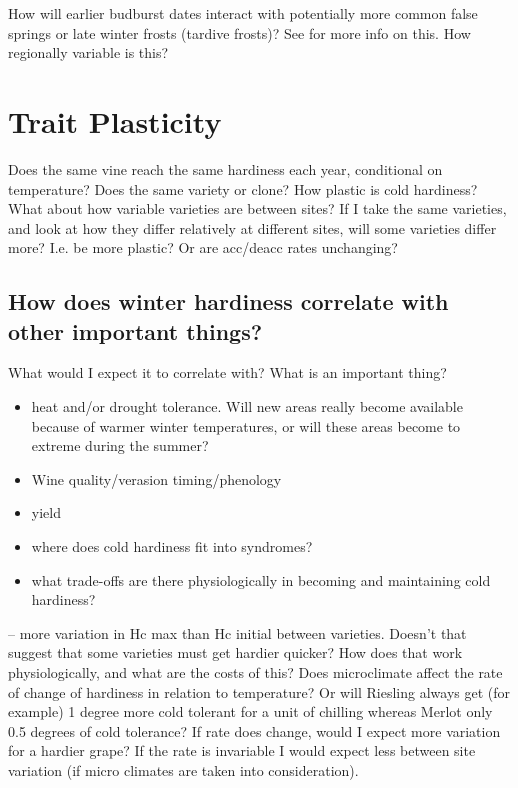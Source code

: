 \documentclass[11pt,letter]{article}
\begin{document}
How will earlier budburst dates interact with potentially more common false springs or late winter frosts (tardive frosts)? See \cite{Sgubin2018} for more info on this. How regionally variable is this?\\

\section{Trait Plasticity} 
Does the same vine reach the same hardiness each year, conditional on temperature? Does the same variety or clone? How plastic is cold hardiness? \\

What about how variable varieties are between sites? If I take the same varieties, and look at how they differ relatively at different sites, will some varieties differ more? I.e. be more plastic? Or are acc/deacc rates unchanging?\\


\subsection{How does winter hardiness correlate with other important things?}
What would I expect it to correlate with? What is an important thing?
\begin{itemize}
\item heat and/or drought tolerance. Will new areas really become available because of warmer winter temperatures, or will these areas become to extreme during the summer?
\item Wine quality/verasion timing/phenology{}
\item yield
\item where does cold hardiness fit into syndromes?
\item what trade-offs are there physiologically in becoming and maintaining cold hardiness?  
\end{itemize}

\cite{Ferguson2014} – more variation in Hc max than Hc initial between varieties. Doesn't that suggest that some varieties must get hardier quicker? How does that work physiologically, and what are the costs of this? Does microclimate affect the rate of change of hardiness in relation to temperature? Or will Riesling always get (for example) 1 degree more cold tolerant for a unit of chilling whereas Merlot only 0.5 degrees of cold tolerance? If rate does change, would I expect more variation for a hardier grape? If the rate is invariable I would expect less between site variation (if micro climates are taken into consideration). \\
\end{document}
